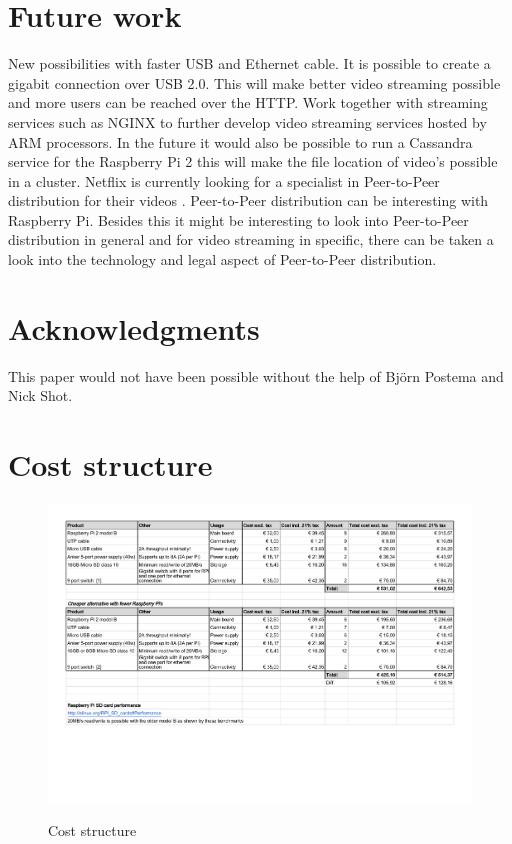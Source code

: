 \documentclass{sig-alternate-br}
\begin{document}
\section{Future work}
New possibilities with faster USB and Ethernet cable. It is possible to create a gigabit connection over USB 2.0. This will make better video streaming possible and more users can be reached over the HTTP. Work together with streaming services such as NGINX to further develop video streaming services hosted by ARM processors. In the future it would also be possible to run a Cassandra service for the Raspberry Pi 2 this will make the file location of video's possible in a cluster. Netflix is currently looking for a specialist in  Peer-to-Peer distribution for their videos \cite{netflix}.  Peer-to-Peer distribution can be interesting with Raspberry Pi. Besides this it might be interesting to look into Peer-to-Peer distribution in general and for video streaming in specific, there can be taken a look into the technology and legal aspect of  Peer-to-Peer distribution. 

\section{Acknowledgments}
This paper would not have been possible without the help of Björn Postema and Nick Shot.
\clearpage

%
%
\vspace{50 mm}


\clearpage
\appendix

\section{Cost structure}\label{sec:cost}
\begin{figure}[H]
	\includegraphics[scale=0.65]{Kostenoverzicht_cluster.pdf}
	\label{fig:cost}
	\caption{Cost structure}
\end{figure}
\end{document}

